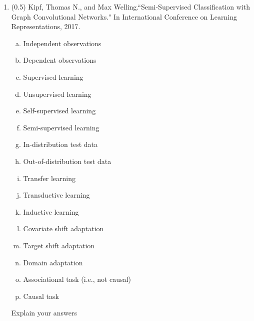 \documentclass{article}
\begin{document}
\newpage
\begin{enumerate}
\item (0.5) Kipf, Thomas N., and Max Welling.``Semi-Supervised Classification with Graph Convolutional Networks." In International Conference on Learning Representations, 2017.
\begin{enumerate}[(a)]
\item Independent observations
\item Dependent observations
\item Supervised learning
\item Unsupervised learning
\item Self-supervised learning
\item Semi-supervised learning
\item In-distribution test data
\item Out-of-distribution test data
\item Transfer learning
\item Transductive learning
\item Inductive  learning
\item Covariate shift adaptation
\item Target shift adaptation
\item Domain adaptation
\item Associational task (i.e., not causal)
\item Causal task
\end{enumerate}
Explain your answers\\
 \underline{\hspace{6in}}\\
 \underline{\hspace{6in}}\\
 \underline{\hspace{6in}}\\
 \underline{\hspace{6in}}\\
 \underline{\hspace{6in}}\\
 \underline{\hspace{6in}}\\
 \underline{\hspace{6in}}\\
 \underline{\hspace{6in}}\\
 \underline{\hspace{6in}}\\
 \underline{\hspace{6in}}\\
 \underline{\hspace{6in}}\\
 \underline{\hspace{6in}}\\
 \underline{\hspace{6in}}\\
 \underline{\hspace{6in}}\\
 \underline{\hspace{6in}}\\
 

\end{enumerate}
\end{document}
